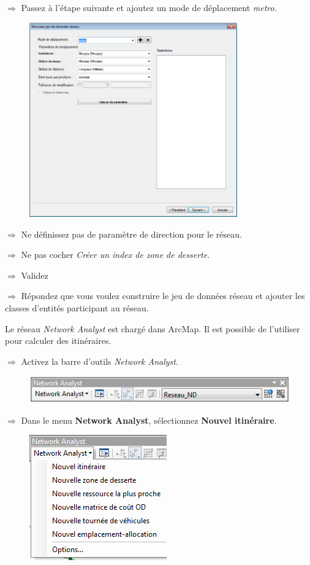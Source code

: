 \documentclass[11pt]{article}
\newcommand{\action}{$\Rightarrow$ }
\begin{document}
\action Passez à l'étape suivante et ajoutez un mode de déplacement \textit{metro}.
\begin{figure}[H]
	\center \includegraphics[width=0.8\textwidth]{img/td3b/network_analyst-7.png} \\
\end{figure}

\action Ne définissez pas de paramètre de direction pour le réseau.

\action Ne pas cocher \textit{Créer un index de zone de desserte}.

\action Validez

\action Répondez que vous voulez construire le jeu de données réseau et ajouter les classes d'entités participant au réseau.

Le réseau \textit{Network Analyst} est chargé dans ArcMap. Il est possible de l'utiliser pour calculer des itinéraires.

\action Activez la barre d'outils \textit{Network Analyst}.
\begin{figure}[H]
	\center \includegraphics{img/td3b/na_barre_outils.png} \\
\end{figure}

\action Dans le menu \textbf{Network Analyst}, sélectionnez \textbf{Nouvel itinéraire}.
\begin{figure}[H]
	\center \includegraphics{img/td3b/na_barre_outils-2.png} \\
\end{figure}
\end{document}
